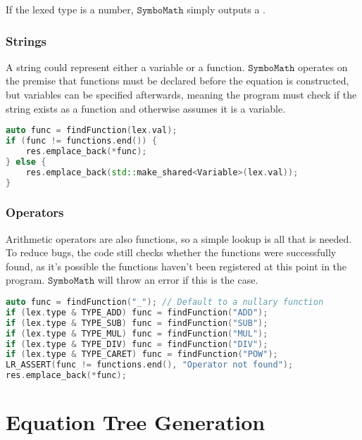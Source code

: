 \documentclass[12pt]{article}
\def\Symbo{{$\texttt{SymboMath}$}}
\begin{document}
If the lexed type is a number, \Symbo{} simply outputs a \linebreak {}.

\subsubsection{Strings}

A string could represent either a variable or a function. \Symbo{} operates on the premise that functions must be declared before the equation is constructed, but variables can be specified afterwards, meaning the program must check if the string exists as a function and otherwise assumes it is a variable.

\begin{lstlisting}[language=C++, caption={Convert from text to either a function or variable}]
auto func = findFunction(lex.val);
if (func != functions.end()) {
	res.emplace_back(*func);
} else {
	res.emplace_back(std::make_shared<Variable>(lex.val));
}
\end{lstlisting}

\subsubsection{Operators}

Arithmetic operators are also functions, so a simple lookup is all that is needed. To reduce bugs, the code still checks whether the functions were successfully found, as it's possible the functions haven't been registered at this point in the program. \Symbo{} will throw an error if this is the case.

\begin{lstlisting}[language=C++, caption={Identify arithmetic operators and convert them to function objects}]
auto func = findFunction("_"); // Default to a nullary function
if (lex.type & TYPE_ADD) func = findFunction("ADD");
if (lex.type & TYPE_SUB) func = findFunction("SUB");
if (lex.type & TYPE_MUL) func = findFunction("MUL");
if (lex.type & TYPE_DIV) func = findFunction("DIV");
if (lex.type & TYPE_CARET) func = findFunction("POW");
LR_ASSERT(func != functions.end(), "Operator not found");
res.emplace_back(*func);
\end{lstlisting}

\pagebreak

\section{Equation Tree Generation}
\end{document}
